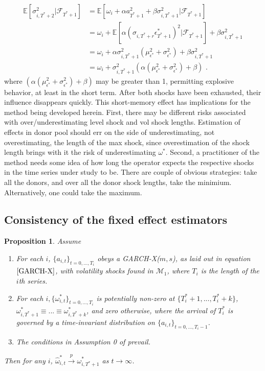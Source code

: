 \documentclass[11pt,3p,review,authoryear]{elsarticle}
\def\mc#1{\mathcal{#1}} %
\def\mc#1{\mathcal{#1}}
\newtheorem{prop}{Proposition}
\theoremstyle{definition}
\begin{document}
\begin{align*}
\mathbb{E}[ \sigma^{2}_{i,T^{*}+2} |\mathcal{F}_{T^{*}+1}] & = \mathbb{E}[\omega_{i} + \alpha a_{T^{*}+1}^{2} + \beta\sigma^{2}_{i,T^{*}+1} |\mathcal{F}_{T^{*}+1}] \\
& = \omega_{i} + \mathbb{E}[\alpha(\sigma_{i,T^{*}+r}\epsilon^{*}_{T^{*}+1})^{2} |\mathcal{F}_{T^{*}+1}] + \beta\sigma^{2}_{i,T^{*}+1} \\
& = \omega_{i} + \alpha\sigma^{2}_{i,T^{*}+1}(\mu^{2}_{\epsilon^{*}} + \sigma^{2}_{\epsilon^{*}}) + \beta\sigma^{2}_{i,T^{*}+1} \\
& = \omega_{i} + \sigma^{2}_{i,T^{*}+1}(\alpha(\mu^{2}_{\epsilon^{*}} + \sigma^{2}_{\epsilon^{*}}) + \beta)\text{ .}
\end{align*}
where $(\alpha(\mu^{2}_{\epsilon^{*}} + \sigma^{2}_{\epsilon^{*}}) + \beta)$ may be greater than 1, permitting explosive behavior, at least in the short term.  After both shocks have been exhausted, their influence disappears quickly.  This short-memory effect has implications for the method being developed herein.  First, there may be different risks associated with over/underestimating level shock and vol shock lengths.  Estimation of effects in donor pool should err on the side of underestimating, not overestimating, the length of the max shock, since overestimation of the shock length brings with it the risk of underestimating $\omega^{*}$.  Second, a practitioner of the method needs some idea of how long the operator expects the respective shocks in the time series under study to be.  There are couple of obvious strategies: take all the donors, and over all the donor shock lengths, take the minimium.  Alternatively, one could take the maximum.


\subsection{Consistency of the fixed effect estimators}

\begin{prop}\label{omega_consistency}
Assume
\begin{enumerate}
  \item For each $i$, $\{a_{i,t}\}_{t=0,...,T_i}$ obeys a GARCH-X($m,s$), as laid out in equation $\eqref{GARCH-X}$, with volatility shocks found in $\mc{M}_{1}$, where $T_i$ is the length of the $i$th series.
  \item For each $i, \{\omega_{i,t}^{*}\}_{t=0,...,T_i}$ is potentially non-zero at $\{T^{*}_{i}+1,... ,T^{*}_{i}+k\}$, $\omega_{i,T^{*}+1}^{*}\equiv...\equiv\omega_{i,T^{*}+k}^{*}$, and zero otherwise, where the arrival of $T_{i}^{*}$ is governed by a time-invariant distribution on $\{a_{i,t}\}_{t=0,...,T_i-1}$. \label{stationarity_of_omega_i_t}
  \item The conditions in Assumption 0 of \citet{han2014asymptotic} prevail.
\end{enumerate}
Then for any $i$, $\hat\omega_{i,t}^{*} \xrightarrow{p} \omega_{i,T^{*}+1}^{*}$ as $t\rightarrow\infty$.
\end{prop}
\end{document}
